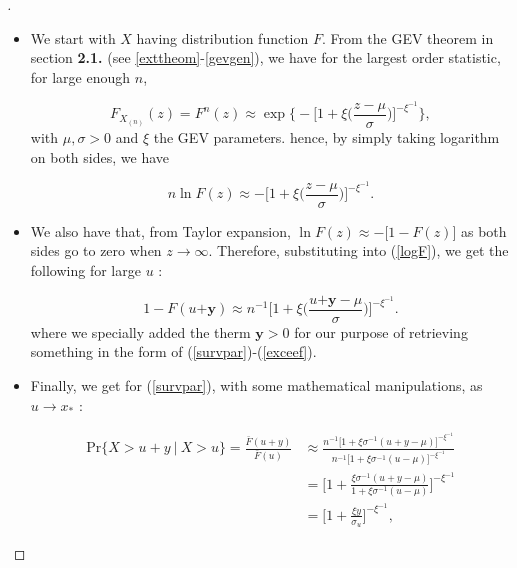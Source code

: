 \documentclass[11pt,a4paper,openany ]{book}
\begin{document}
\begin{proof}[\nopunct ] 
\ \ \ \begin{itemize}
	 \item We start with $X$ having distribution function $F$. From the GEV theorem in section %
	 \textbf{2.1.} (see \ref{exttheom}-\ref{gevgen}), we have for the largest order statistic, for large enough $n$,  
	
	\begin{equation}
	F_{X_{(n)}}(z)=F^n(z)\approx \exp\Bigg\{ -\bigg[1+\xi\bigg(\frac{z-\mu}{\sigma}\bigg)\bigg]^{-\xi^{-1}}\Bigg\},
	\end{equation} 
	with $\mu,\sigma>0$ and $\xi$ the GEV parameters. hence, by simply taking logarithm on both sides, we have
	
	\begin{equation} \label{logF}
	n \ln F(z)\approx -\Bigg[1+\xi\bigg(\frac{z-\mu}{\sigma}\bigg)\Bigg]^{-\xi^{-1}}.
	\end{equation}
		\item We also have that, from Taylor expansion,
		$\ln F(z)\approx -\big[1-F(z)\big]$
		as both sides go to zero when $z\rightarrow\infty$. Therefore, substituting into (\ref{logF}), we get the following for large $u$ :
		
		\begin{equation*}
		1-F(u\boldsymbol{+y})\approx n^{-1}\bigg[1+\xi\bigg(\frac{u\boldsymbol{+y}-\mu}{\sigma}\bigg)\bigg]^{-\xi^{-1}}.
		\end{equation*}
		where we specially added the therm $\boldsymbol{y}>0$ for our purpose of retrieving something in the form of 
		(\ref{survpar})-(\ref{exceef}). 
		
		\item Finally, we get for (\ref{survpar}), with some mathematical manipulations, as 
		$u\rightarrow x_*$ :
		
		
		\begin{equation*}
		\begin{aligned}
		\text{Pr}\{X>u+y\ | \ X>u\}
		= \frac{\bar{F}(u+y)}{\bar{F}(u)} 
		& \approx\frac{n^{-1}\big[1+\xi\sigma^{-1}(u+y-\mu)\big]^{-\xi^{-1}}}{n^{-1}\big[1+\xi\sigma^{-1}(u-\mu)\big]^{-\xi^{-1}}} \\  
		& = \bigg[1+\frac{\xi\sigma^{-1}(u+y-\mu)}{1+\xi\sigma^{-1}(u-\mu)}\bigg]^{-\xi^{-1}} \\
		& = \bigg[1+\frac{\xi y}{\sigma_u}\bigg]^{-\xi^{-1}},
		\end{aligned}
		\end{equation*}
		

\end{itemize}
\end{proof}
\end{document}
